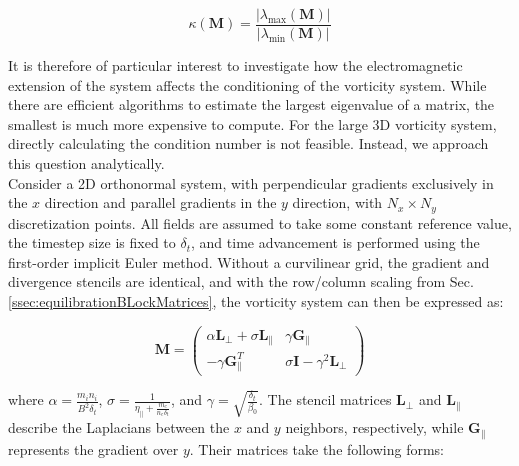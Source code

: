 \begin{equation}
	\label{eq:Impl_defConditionNumber}
	\kappa\left(\textbf{M}\right) = \frac{\left|\lambda_{\text{max}}(\textbf{M})\right|}{\left|\lambda_{\text{min}}(\textbf{M})\right|}
\end{equation}

It is therefore of particular interest to investigate how the electromagnetic extension of the system affects the conditioning of the vorticity system. While there are efficient algorithms to estimate the largest eigenvalue of a matrix, the smallest is much more expensive to compute. For the large 3D vorticity system, directly calculating the condition number is not feasible. Instead, we approach this question analytically. \\

Consider a 2D orthonormal system, with perpendicular gradients exclusively in the $x$ direction and parallel gradients in the $y$ direction, with $N_x \times N_y$ discretization points. All fields are assumed to take some constant reference value, the timestep size is fixed to $\delta_t$, and time advancement is performed using the first-order implicit Euler method. Without a curvilinear grid, the gradient and divergence stencils are identical, and with the row/column scaling from Sec. \ref{ssec:equilibrationBLockMatrices}, the vorticity system can then be expressed as:


\begin{equation}
	\textbf{M} = 
	\begin{pmatrix}
		\alpha \textbf{L}_\perp + \sigma \textbf{L}_\parallel & \gamma \textbf{G}_\parallel \\ -\gamma \textbf{G}_\parallel^T & \sigma \textbf{I} - \gamma^2\textbf{L}_\perp
	\end{pmatrix}
\end{equation}

where $\alpha = \frac{m_in_i}{B^2\delta_t}$, $\sigma = \frac{1}{\eta_\parallel + \frac{m_e}{n_e \delta_t}}$, and $\gamma = \sqrt{\frac{\delta_t }{\beta_0}}$. The stencil matrices $\textbf{L}_\perp$ and $\textbf{L}_\parallel$ describe the Laplacians between the $x$ and $y$ neighbors, respectively, while $\textbf{G}_\parallel$ represents the gradient over $y$. Their matrices take the following forms:


